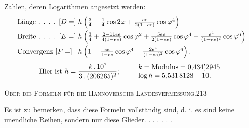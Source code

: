 Zahlen, deren Logarithmen angesetzt werden:
\[
\begin{array}{@{}l@{\;}l@{}}
\text{Länge . . . . }[D=]&h\left(\frac34-\frac14\cos2\varphi+\frac{ee}{2(1-ee)}\cos\varphi^4\right)\\[6pt]
\text{Breite . . . . }[E=]&h\left(\frac34+\frac{2-11ee}{4(1-ee)}\cos\varphi^2+\frac{5ee}{2(1-ee)}\cos\varphi^4-\frac{e^4}{(1-ee)^2}\cos\varphi^6\right)\\[6pt]
\text{Convergenz }[F=]&h\left(1-\frac{ee}{1-ee}\cos\varphi^4-\frac{2e^4}{(1-ee)^2}\cos\varphi^6\right).
\end{array}
\]
\[
\text{Hier ist }h=\frac{k\,.\,10^7}{3\,.\,(206265)^2};\qquad
\begin{array}{l}
k=\text{Modulus}=0{,}434\rlap{\raisebox{-.5ex}{\tiny.}}^{\prime}2945\\
\log h=5{,}531\,8128-10.
\end{array}
\]

\par\clearpage
\noindent\mbox{}\hfill{\small\textsc{Über die Formeln für die Hannoversche Landesvermessung.}}\hfill213\par\medskip
Es ist zu bemerken, dass diese Formeln vollständig sind, d. i. es sind keine unendliche Reihen, sondern nur diese Glieder. . . . . . .

